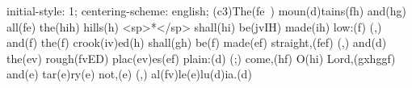 initial-style: 1;
centering-scheme: english;
(c3)The(fe~) moun(d)tains(fh) and(hg) all(fe) the(hih) hills(h) <sp>*</sp> shall(hi) be(jvIH) made(ih) low:(f) (,) and(f) the(f) crook(iv)ed(h) shall(gh) be(f) made(ef) straight,(fef) (,) and(d) the(ev) rough(fvED) plac(ev)es(ef) plain:(d) (;) come,(hf) O(hi) Lord,(gxhggf) and(e) tar(e)ry(e) not,(e) (,) al(fv)le(e)lu(d)ia.(d)
